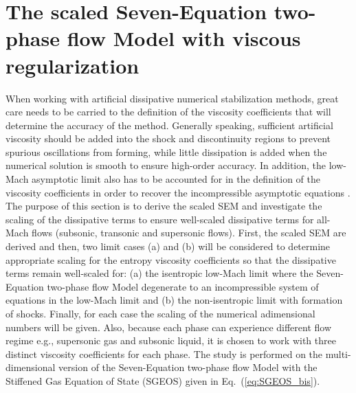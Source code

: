 \documentclass[preprint,10pt]{elsarticle}
\newcommand{\eqt}[1]{Eq.~(\ref{#1})}                     %
\begin{document}
\section{The scaled Seven-Equation two-phase flow Model with viscous regularization}\label{sec:low-Mach}
%
When working with artificial dissipative numerical stabilization methods, great care needs to be carried to the definition of the viscosity coefficients that will determine the accuracy of the method. Generally speaking, sufficient artificial viscosity should be added into the shock and discontinuity regions to prevent spurious oscillations from forming, while little dissipation is added when the numerical solution is smooth to ensure high-order accuracy. In addition, the low-Mach asymptotic limit also has to be accounted for in the definition of the viscosity coefficients in order to recover the incompressible asymptotic equations \cite{LowMach1, LowMach2, LowMach3}. The purpose of this section is to derive the scaled SEM and investigate the scaling of the dissipative terms to ensure well-scaled dissipative terms for all-Mach flows (subsonic, transonic and supersonic flows). First, the scaled SEM are derived and then, two limit cases (a) and (b) will be considered to determine appropriate scaling for the entropy 
viscosity coefficients so that the dissipative terms remain well-scaled for: 
(a) the isentropic low-Mach limit where the Seven-Equation two-phase flow Model degenerate to an incompressible system of 
equations in the low-Mach limit and (b) the non-isentropic limit with formation of shocks. Finally, for each case the scaling of the numerical adimensional numbers will be given. Also, because each phase can experience different flow regime e.g., supersonic gas and subsonic liquid, it is chosen to work with three distinct viscosity coefficients for each phase. The study is performed on the multi-dimensional version of the Seven-Equation two-phase flow Model with the Stiffened Gas Equation of State (SGEOS) given in \eqt{eq:SGEOS_bis}.
\end{document}
